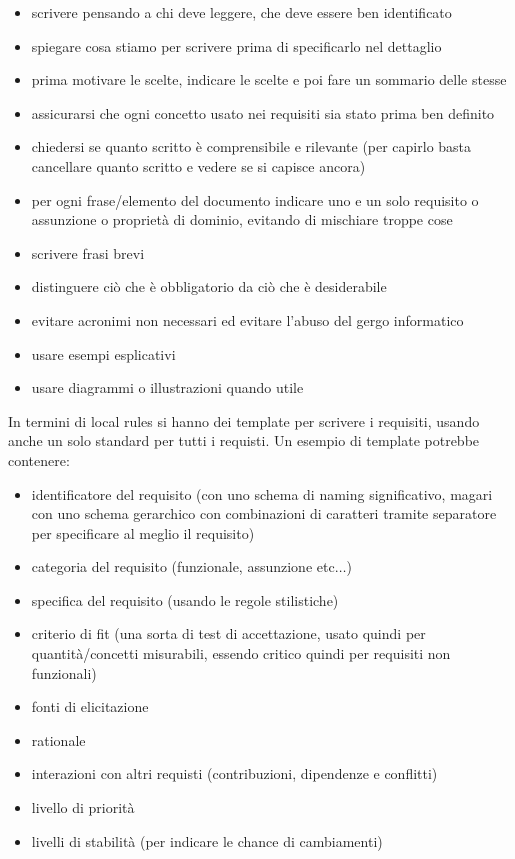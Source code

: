 \documentclass[a4paper,12pt, oneside]{book}
\begin{document}
\begin{itemize}
  \item scrivere pensando a chi deve leggere, che deve essere ben identificato
  \item spiegare cosa stiamo per scrivere prima di specificarlo nel dettaglio
  \item prima motivare le scelte, indicare le scelte e poi fare un sommario
  delle stesse 
  \item assicurarsi che ogni concetto usato nei requisiti sia stato prima ben
  definito 
  \item chiedersi se quanto scritto è comprensibile e rilevante (per capirlo
  basta cancellare quanto scritto e vedere se si capisce ancora)
  \item per ogni frase/elemento del documento indicare uno e un solo requisito o
  assunzione o proprietà di dominio, evitando di mischiare troppe cose
  \item scrivere frasi brevi
  \item distinguere ciò che è obbligatorio da ciò che è desiderabile
  \item evitare acronimi non necessari ed evitare l'abuso del gergo informatico
  \item usare esempi esplicativi
  \item usare diagrammi o illustrazioni quando utile
\end{itemize}
In termini di local rules si hanno dei template per scrivere i requisiti, usando
anche un solo standard per tutti i requisti. Un esempio di template potrebbe
contenere:
\begin{itemize}
  \item identificatore del requisito (con uno schema di naming significativo,
  magari con uno schema gerarchico con combinazioni di caratteri tramite
  separatore per specificare al meglio il requisito)
  \item categoria del requisito (funzionale, assunzione etc$\ldots$)
  \item specifica del requisito (usando le regole stilistiche)
  \item criterio di fit (una sorta di test di accettazione, usato quindi per
  quantità/concetti misurabili, essendo critico quindi per requisiti non
  funzionali) 
  \item fonti di elicitazione
  \item rationale
  \item interazioni con altri requisti (contribuzioni, dipendenze e conflitti)
  \item livello di priorità
  \item livelli di stabilità (per indicare le chance di cambiamenti)
\end{itemize}
\end{document}
